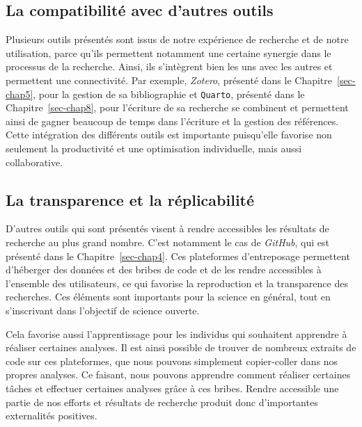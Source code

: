 \documentclass[
  letterpaper,
  DIV=11,
  numbers=noendperiod,
  oneside]{scrreprt}
\begin{document}
\hypertarget{la-compatibilituxe9-avec-dautres-outils}{%
\subsection{La compatibilité avec d'autres
outils}\label{la-compatibilituxe9-avec-dautres-outils}}

Plusieurs outils présentés sont issus de notre expérience de recherche
et de notre utilisation, parce qu'ils permettent notamment une certaine
synergie dans le processus de la recherche. Ainsi, ils s'intègrent bien
les uns avec les autres et permettent une connectivité. Par exemple,
\emph{Zotero}, présenté dans le Chapitre~\ref{sec-chap5}, pour la
gestion de sa bibliographie et \texttt{Quarto}, présenté dans le
Chapitre~\ref{sec-chap8}, pour l'écriture de sa recherche se combinent
et permettent ainsi de gagner beaucoup de temps dans l'écriture et la
gestion des références. Cette intégration des différents outils est
importante puisqu'elle favorise non seulement la productivité et une
optimisation individuelle, mais aussi collaborative.

\hypertarget{la-transparence-et-la-ruxe9plicabilituxe9}{%
\subsection{La transparence et la
réplicabilité}\label{la-transparence-et-la-ruxe9plicabilituxe9}}

D'autres outils qui sont présentés visent à rendre accessibles les
résultats de recherche au plus grand nombre. C'est notamment le cas de
\emph{GitHub}, qui est présenté dans le Chapitre~\ref{sec-chap4}. Ces
plateformes d'entreposage permettent d'héberger des données et des
bribes de code et de les rendre accessibles à l'ensemble des
utilisateurs, ce qui favorise la reproduction et la transparence des
recherches. Ces éléments sont importants pour la science en général,
tout en s'inscrivant dans l'objectif de science ouverte.

Cela favorise aussi l'apprentissage pour les individus qui souhaitent
apprendre à réaliser certaines analyses. Il est ainsi possible de
trouver de nombreux extraits de code sur ces plateformes, que nous
pouvons simplement copier-coller dans nos propres analyses. Ce faisant,
nous pouvons apprendre comment réaliser certaines tâches et effectuer
certaines analyses grâce à ces bribes. Rendre accessible une partie de
nos efforts et résultats de recherche produit donc d'importantes
externalités positives.
\end{document}
